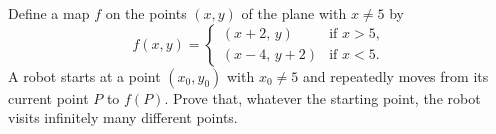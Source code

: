 Define a map $f$ on the points $(x,y)$ of the plane with $x\ne5$ by
\[f(x,y)=\begin{cases}(x+2,\,y)&\text{if }x>5,\\(x-4,\,y+2)&\text{if }x<5.\end{cases}\]
A robot starts at a point $(x_0,y_0)$ with $x_0\ne5$ and repeatedly moves from its current point $P$ to $f(P)$. Prove that, whatever the starting point, the robot visits infinitely many different points.
